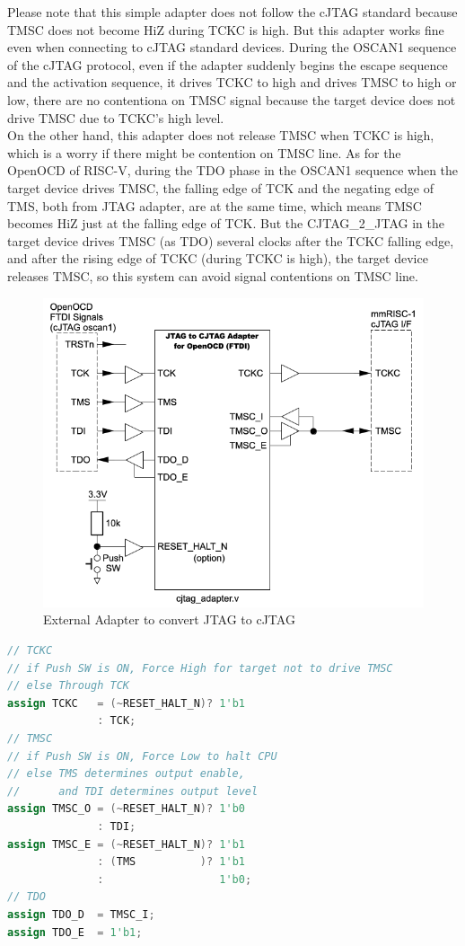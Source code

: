 Please note that this simple adapter does not follow the cJTAG standard because TMSC does not become HiZ during TCKC is high. But this adapter works fine even when connecting to cJTAG standard devices. During the OSCAN1 sequence of the cJTAG protocol, even if the adapter suddenly begins the escape sequence and the activation sequence, it drives TCKC to high and drives TMSC to high or low, there are no contentiona on TMSC signal because the target device does not drive TMSC due to TCKC's high level. \\
On the other hand, this adapter does not release TMSC when TCKC is high, which is a worry if there might be contention on TMSC line. As for the OpenOCD of RISC-V, during the TDO phase in the OSCAN1 sequence when the target device drives TMSC, the falling edge of TCK and the negating edge of TMS, both from JTAG adapter, are at the same time, which means TMSC becomes HiZ just at the falling edge of TCK. But the CJTAG\_2\_JTAG in the target device drives TMSC (as TDO) several clocks after the TCKC falling edge, and after the rising edge of TCKC (during TCKC is high), the target device releases TMSC, so this system can avoid signal contentions on TMSC line.

\begin{figure}[H]
    \includegraphics[width=0.8\columnwidth]{./Figure/cJTAG_ADAPTER.png}
    \caption{External Adapter to convert JTAG to cJTAG}
    \label{fig:cJTAG_ADAPTER}
\end{figure}

\begin{lstlisting}[caption=RTL code of cjtag\_adapter.v, label=list:cJTAG_ADAPTER, captionpos=b, language=Verilog, basicstyle=\ttfamily\scriptsize, frame=single]
// TCKC
// if Push SW is ON, Force High for target not to drive TMSC
// else Through TCK
assign TCKC   = (~RESET_HALT_N)? 1'b1
              : TCK;
// TMSC
// if Push SW is ON, Force Low to halt CPU
// else TMS determines output enable, 
//      and TDI determines output level
assign TMSC_O = (~RESET_HALT_N)? 1'b0
              : TDI;
assign TMSC_E = (~RESET_HALT_N)? 1'b1
              : (TMS          )? 1'b1
              :                  1'b0;
// TDO
assign TDO_D  = TMSC_I;
assign TDO_E  = 1'b1;
\end{lstlisting}

